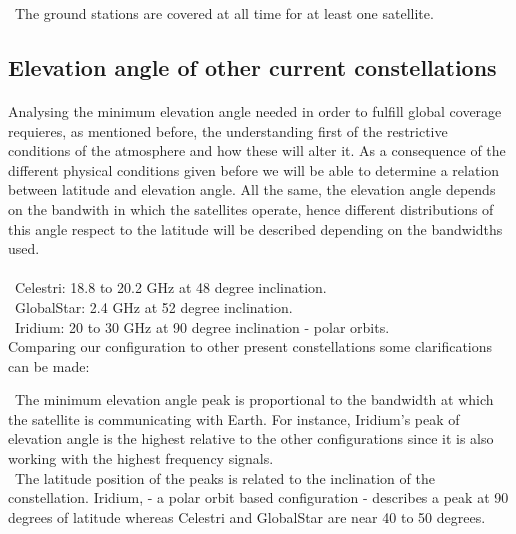 \textendash\ The ground stations are covered at all time for at least one satellite.\\

\subsection{Elevation angle of other current constellations}

\paragraph{}

Analysing the minimum elevation angle needed in order to fulfill global coverage requieres, as mentioned before, the understanding first of the restrictive conditions of the atmosphere and how these will alter it. As a consequence of the different physical conditions given before we will be able to determine a relation between latitude and elevation angle. All the same, the elevation angle depends on the bandwith in which the satellites operate, hence different distributions of this angle respect to the latitude will be described depending on the bandwidths used. 


\paragraph{}

\textendash\ Celestri: 18.8 to 20.2 GHz at 48 degree inclination.\\
\textendash\ GlobalStar: 2.4 GHz at 52 degree inclination.\\
\textendash\ Iridium: 20 to 30 GHz at 90 degree inclination - polar orbits.\\

Comparing our configuration to other present constellations some clarifications can be made: 

\textendash\ The minimum elevation angle peak is proportional to the bandwidth at which the satellite is communicating with Earth. For instance, Iridium's peak of elevation angle is the highest relative to the other configurations since it is also working with the highest frequency signals. \\

\textendash\ The latitude position of the peaks is related to the inclination of the constellation. Iridium, - a polar orbit based configuration - describes a peak at 90 degrees of latitude whereas Celestri and GlobalStar are near 40 to 50 degrees. \\

